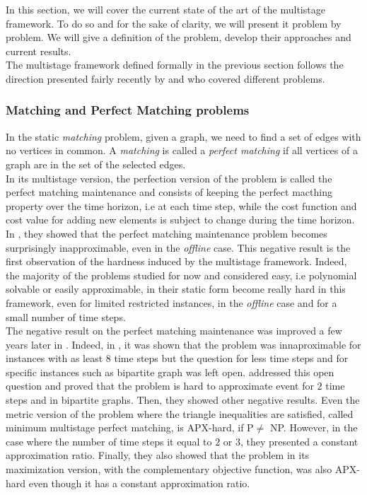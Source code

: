 \documentclass[a4paper]{book}
\begin{document}
In this section, we will cover the current state of the art of the multistage framework. To do so and for the sake of clarity, we will present it problem by problem. We will give a definition of the problem, develop their approaches and current results.\\
The multistage framework defined formally in the previous section follows the direction presented fairly recently by \cite{Gupta} and \cite{Eisenstat} who covered different problems.

\subsubsection{Matching and Perfect Matching problems}
In the static {\emph {matching}} problem, given a graph, we need to find a set of edges with no vertices in common. A {\emph {matching}} is called a {\emph {perfect matching}} if all vertices of a graph are in the set of the selected edges.\\ 
In its multistage version, the perfection version of the problem is called the {\sc perfect matching maintenance} and consists of keeping the perfect macthing property over the time horizon, i.e at each time step, while the cost function and cost value for adding new elements is subject to change during the time horizon.\\

In \cite{Gupta}, they showed that the {\sc perfect matching maintenance} problem becomes surprisingly inapproximable, even in the \emph{offline} case. This negative result is the first observation of the hardness induced by the multistage framework. Indeed, the majority of the problems studied for now and considered easy, i.e polynomial solvable or easily approximable, in their static form become really hard in this framework, even for limited restricted instances, in the \emph{offline} case and for a small number of time steps.\\

The negative result on the {\sc perfect matching maintenance} was improved a few years later in \cite{bampis2018multistage}. Indeed, in \cite{Gupta}, it was shown that the problem was innaproximable for instances with as least $8$ time steps but the question for less time steps and for specific instances such as bipartite graph was left open. \cite{bampis2018multistage} addressed this open question and proved that the problem is hard to approximate event for $2$ time steps and in bipartite graphs. Then, they showed other negative results. Even the metric version of the problem where the triangle inequalities are satisfied, called {\sc minimum multistage perfect matching}, is APX-hard, if P$\ne$ NP. However, in the case where the number of time steps it equal to $2$ or $3$, they presented a constant approximation ratio. Finally, they also showed that the problem in its maximization version, with the complementary objective function, was also APX-hard even though it has a constant approximation ratio. \\
\end{document}
